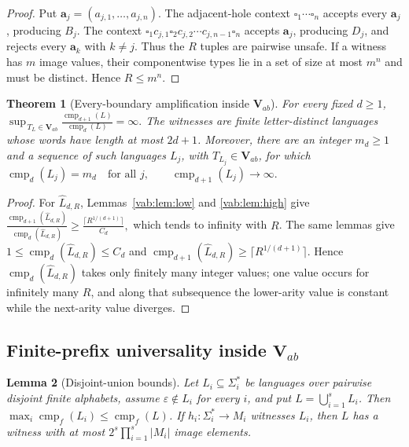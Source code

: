 \documentclass[10pt,a4paper]{article}
\newtheorem{theorem}{Theorem}[section]
\newtheorem{lemma}[theorem]{Lemma}
\theoremstyle{definition}
\theoremstyle{remark}
\newcommand{\cmp}{\operatorname{cmp}}
\newcommand{\blank}{\square}
\begin{document}
\begin{proof}
Put \(\mathbf a_j=(a_{j,1},\ldots,a_{j,n}).\) The adjacent-hole context \(\blank_1\cdots\blank_n\) accepts every
\(\mathbf a_j\), producing \(B_j\). The context
\(\blank_1c_{j,1}\blank_2c_{j,2}\cdots c_{j,n-1}\blank_n\)
accepts \(\mathbf a_j\), producing \(D_j\), and rejects every
\(\mathbf a_k\) with \(k\ne j\). Thus the \(R\) tuples are pairwise unsafe.
If a witness has \(m\) image values, their componentwise types lie in a set of
size at most \(m^n\) and must be distinct. Hence \(R\le m^n\).
\end{proof}

\begin{theorem}[Every-boundary amplification inside \(\mathbf V_{ab}\)]
\label{vab:thm:amplification}
For every fixed \(d\ge1\),
\(\sup_{\,T_L\in\mathbf V_{ab}} \frac{\cmp_{d+1}(L)}{\cmp_d(L)} =\infty.\)
The witnesses are finite letter-distinct languages whose words have length at
most \(2d+1\).  Moreover, there are an integer \(m_d\ge1\) and a sequence
of such languages \(L_j\), with \(T_{L_j}\in\mathbf V_{ab}\), for which
\(\cmp_d(L_j)=m_d \quad\text{for all }j, \qquad \cmp_{d+1}(L_j)\longrightarrow\infty.\)
\end{theorem}

\begin{proof}
For \(\widehat L_{d,R}\), Lemmas~\ref{vab:lem:low} and
\ref{vab:lem:high} give
\(\frac{\cmp_{d+1}(\widehat L_{d,R})} {\cmp_d(\widehat L_{d,R})} \ge \frac{\lceil R^{1/(d+1)}\rceil}{C_d},\)
which tends to infinity with \(R\).  The same lemmas give
\(1\le\cmp_d(\widehat L_{d,R})\le C_d\) and
\(\cmp_{d+1}(\widehat L_{d,R})\ge\lceil R^{1/(d+1)}\rceil\).
Hence \(\cmp_d(\widehat L_{d,R})\) takes only finitely many integer values;
one value occurs for infinitely many \(R\), and along that subsequence the
lower-arity value is constant while the next-arity value diverges.
\end{proof}

\subsection{Finite-prefix universality inside \texorpdfstring{\(\mathbf V_{ab}\)}{Vab}}

\begin{lemma}[Disjoint-union bounds]
\label{vab:lem:union}
Let \(L_i\subseteq\Sigma_i^*\) be languages over pairwise disjoint finite
alphabets, assume \(\varepsilon\notin L_i\) for every \(i\), and put
\(L=\bigcup_{i=1}^sL_i\). Then
\(\max_i\cmp_f(L_i)\le\cmp_f(L)\). If
\(h_i:\Sigma_i^*\to M_i\) witnesses \(L_i\), then \(L\) has a witness with at
most \(2^s\prod_{i=1}^s|M_i|\) image elements.
\end{lemma}
\end{document}
